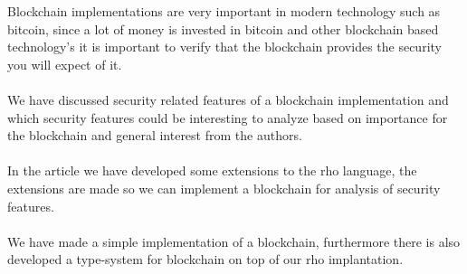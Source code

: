 Blockchain implementations are very important in modern technology such as bitcoin, since a lot of money is invested in bitcoin and other blockchain based technology's it is important to verify that the blockchain provides the security you will expect of it.\\
\\
We have discussed security related features of a blockchain implementation and which security features could be interesting to analyze based on importance for the blockchain and general interest from the authors.\\
\\
In the article we have developed some extensions to the rho language, the extensions are made so we can implement a blockchain for analysis of security features.\\
\\
We have made a simple implementation of a blockchain, furthermore there is also developed a type-system for blockchain on top of our rho implantation.